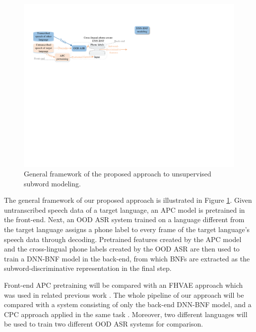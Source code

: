 \documentclass[a4paper]{article}
\begin{document}
\begin{figure}
    \centering
    \includegraphics[width=0.95\linewidth]{LaTeX/apc_framework_detail_other_lang.pdf}
    \caption{General framework of the proposed approach to unsupervised subword modeling.  }
    \label{fig:general_framework}
\end{figure}
The general framework of our proposed approach is illustrated in Figure \ref{fig:general_framework}. Given untranscribed speech data of a  target  language, an APC  model is pretrained in the front-end.
Next, an OOD ASR system trained on a language different from the target language  assigns a phone label to every frame of the target language's speech data through decoding. Pretrained features  created by the APC model and the cross-lingual phone labels created by the OOD ASR are then used to train a DNN-BNF model in the back-end, from which BNFs are extracted as the subword-discriminative representation in the final step.

Front-end APC pretraining will be compared with an FHVAE approach \cite{hsu2017nips} which was used in related previous work \cite{Feng2019improving}. The whole pipeline of our approach will be compared with a system consisting of only the back-end DNN-BNF model, and a CPC approach \cite{oord2018cpc} applied in the same task \cite{kahn2019librilight}.
Moreover, two different languages will be used to train two different OOD ASR systems for comparison.
\end{document}
